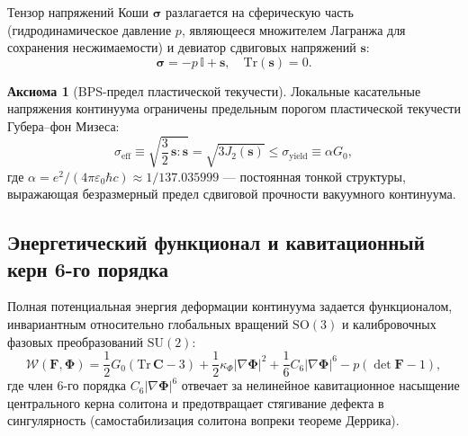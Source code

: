 \documentclass[11pt,a4paper,oneside]{article}
\theoremstyle{plain}
\theoremstyle{definition}
\newtheorem{axiom}{Аксиома}
\theoremstyle{remark}
\numberwithin{equation}{section}
\begin{document}
	Тензор напряжений Коши $\boldsymbol{\sigma}$ разлагается на сферическую часть (гидродинамическое давление $p$, являющееся множителем Лагранжа для сохранения несжимаемости) и девиатор сдвиговых напряжений $\mathbf{s}$:
	\begin{equation}
		\boldsymbol{\sigma} = -p \, \mathbb{I} + \mathbf{s}, \quad \mathrm{Tr}(\mathbf{s}) = 0.
	\end{equation}
	
	\begin{axiom}[BPS-предел пластической текучести]
		Локальные касательные напряжения континуума ограничены предельным порогом пластической текучести Губера--фон Мизеса:
		\begin{equation}
			\sigma_{\text{eff}} \equiv \sqrt{\frac{3}{2} \, \mathbf{s} : \mathbf{s}} = \sqrt{3 J_2(\mathbf{s})} \le \sigma_{\text{yield}} \equiv \alpha G_0,
			\label{eq:mises_yield}
		\end{equation}
		где $\alpha = e^2 / (4\pi \varepsilon_0 \hbar c) \approx 1/137.035999$ — постоянная тонкой структуры, выражающая безразмерный предел сдвиговой прочности вакуумного континуума.
	\end{axiom}
	
	\subsection{Энергетический функционал и кавитационный керн 6-го порядка}
	
	Полная потенциальная энергия деформации континуума задается функционалом, инвариантным относительно глобальных вращений $\mathrm{SO}(3)$ и калибровочных фазовых преобразований $\mathrm{SU}(2)$:
	\begin{equation}
		\mathcal{W}(\mathbf{F}, \boldsymbol{\Phi}) = \frac{1}{2} G_0 \left( \mathrm{Tr}\,\mathbf{C} - 3 \right) + \frac{1}{2} \kappa_\Phi |\nabla \boldsymbol{\Phi}|^2 + \frac{1}{6} C_6 |\nabla \boldsymbol{\Phi}|^6 - p (\det \mathbf{F} - 1),
		\label{eq:energy_functional}
	\end{equation}
	где член 6-го порядка $C_6 |\nabla \boldsymbol{\Phi}|^6$ отвечает за нелинейное кавитационное насыщение центрального керна солитона и предотвращает стягивание дефекта в сингулярность (самостабилизация солитона вопреки теореме Деррика).
	
\end{document}
